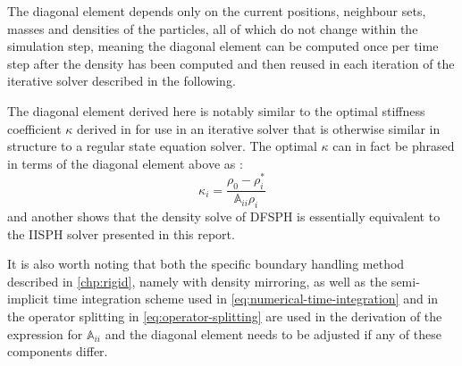 \documentclass[oneside, a4paper]{book}
\newcommand\vek[1]{\vec{\bm{#1}}}
\newcommand\br[1]{\left(#1\right)}
\begin{document}
    
    The diagonal element depends only on the current positions, neighbour sets, masses and densities of the particles, all of which do not change within the simulation step, meaning the diagonal element can be computed once per time step after the density has been computed and then reused in each iteration of the iterative solver described in the following. 

    The diagonal element derived here is notably similar to the optimal stiffness coefficient $\kappa$ derived in \autocite[Divergence-Free SPH]{dfsph} for use in an iterative solver that is otherwise similar in structure to a regular state equation solver. The optimal $\kappa$ can in fact be phrased in terms of the diagonal element above as \autocite{dfsph}:
    \begin{equation}\label{eq:dfsph-kappa-di}
      \kappa_i = \frac{\rho_0 - \rho_i^*}{\mathds{A}_{ii}\rho_i}
    \end{equation}
    and another \autocite[survey paper]{2022-survey-equographics-star} shows that the density solve of DFSPH is essentially equivalent to the IISPH solver presented in this report.
    
    It is also worth noting that both the specific boundary handling method described in \autoref{chp:rigid}, namely \autocite[consistent boundaries]{consistent-boundaries} with density mirroring, as well as the semi-implicit time integration scheme used in \autoref{eq:numerical-time-integration} and in the operator splitting in \autoref{eq:operator-splitting} are used in the derivation of the expression for $\mathds{A}_{ii}$ and the diagonal element needs to be adjusted if any of these components differ.
\end{document}
